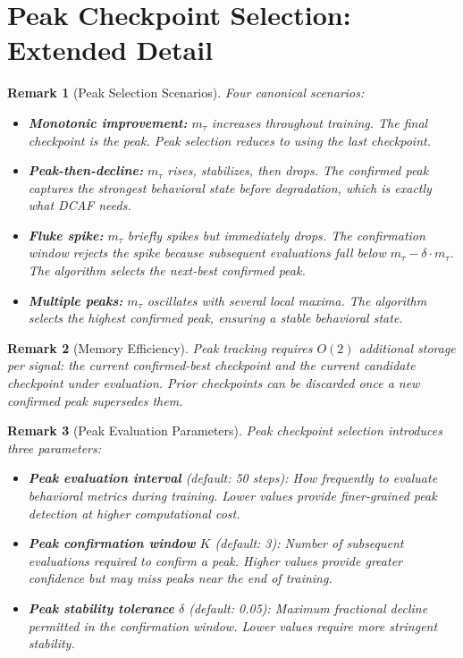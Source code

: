 \documentclass[11pt]{article}
\newtheorem{remark}{Remark}[section]
\begin{document}
\section{Peak Checkpoint Selection: Extended Detail}
\label{app:peak-detail}

\begin{remark}[Peak Selection Scenarios]
Four canonical scenarios:
\begin{itemize}[nosep]
\item \textbf{Monotonic improvement:} $m_\tau$ increases throughout training. The final checkpoint is the peak. Peak selection reduces to using the last checkpoint.
\item \textbf{Peak-then-decline:} $m_\tau$ rises, stabilizes, then drops. The confirmed peak captures the strongest behavioral state before degradation, which is exactly what DCAF needs.
\item \textbf{Fluke spike:} $m_\tau$ briefly spikes but immediately drops. The confirmation window rejects the spike because subsequent evaluations fall below $m_\tau - \delta \cdot m_\tau$. The algorithm selects the next-best confirmed peak.
\item \textbf{Multiple peaks:} $m_\tau$ oscillates with several local maxima. The algorithm selects the highest confirmed peak, ensuring a stable behavioral state.
\end{itemize}
\end{remark}

\begin{remark}[Memory Efficiency]
Peak tracking requires $O(2)$ additional storage per signal: the current confirmed-best checkpoint and the current candidate checkpoint under evaluation. Prior checkpoints can be discarded once a new confirmed peak supersedes them.
\end{remark}

\begin{remark}[Peak Evaluation Parameters]
Peak checkpoint selection introduces three parameters:
\begin{itemize}[nosep]
\item \textbf{Peak evaluation interval} (default: 50 steps): How frequently to evaluate behavioral metrics during training. Lower values provide finer-grained peak detection at higher computational cost.
\item \textbf{Peak confirmation window} $K$ (default: 3): Number of subsequent evaluations required to confirm a peak. Higher values provide greater confidence but may miss peaks near the end of training.
\item \textbf{Peak stability tolerance} $\delta$ (default: 0.05): Maximum fractional decline permitted in the confirmation window. Lower values require more stringent stability.
\end{itemize}
\end{remark}
\end{document}

